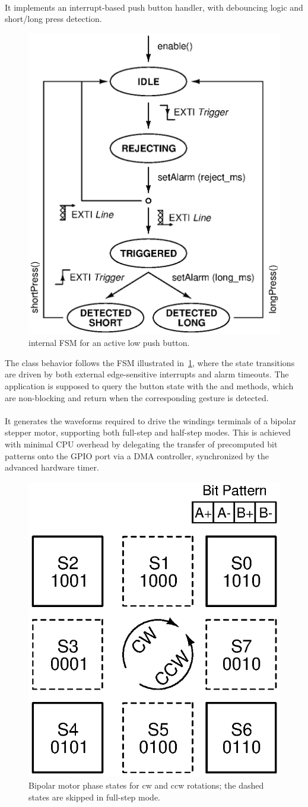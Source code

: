 \paragraph{} It implements an interrupt-based push button handler, with debouncing logic and short/long press detection.

\begin{figure}
    \centering
    \includegraphics[width=.5\linewidth]{../gfx/PushButton_fsm.eps}
    \caption{ internal FSM for an active low push button.}
    \label{fig:pb_fsm}
\end{figure}

The class behavior follows the FSM illustrated in~\cref{fig:pb_fsm}, where the state transitions are driven by both external edge-sensitive interrupts and alarm timeouts. 
The application is supposed to query the button state with the  and  methods, which are non-blocking and return  when the corresponding gesture is detected.

\paragraph{} It generates the waveforms required to drive the windings terminals of a bipolar stepper motor, supporting both full-step and half-step modes. This is achieved with minimal CPU overhead by delegating the transfer of precomputed bit patterns onto the GPIO port via a DMA controller, synchronized by the advanced hardware timer.

\begin{figure}
    \centering
    \includegraphics[width=.35\linewidth]{../gfx/Translator_states.eps}
    \caption{Bipolar motor phase states for \acs{cw} and \acs{ccw} rotations; the dashed states are skipped in full-step mode.}
    \label{fig:bsteps}
\end{figure}

